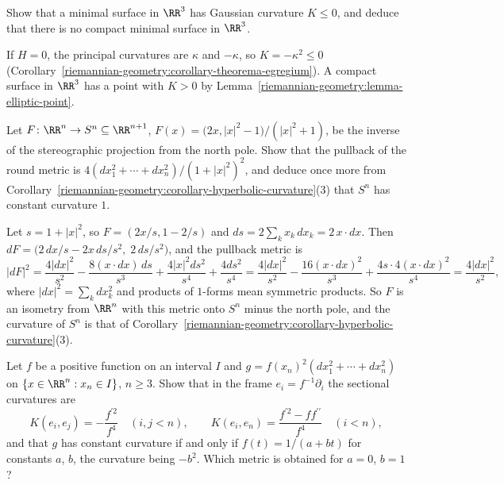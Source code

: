 \begin{exercise}\label{riemannian-geometry:exercise-no-compact-minimal}
Show that a minimal surface in $\RR^3$ has Gaussian curvature $K \leq 0$, and deduce that there is no compact minimal surface in $\RR^3$.
\end{exercise}

\begin{solution}
If $H = 0$, the principal curvatures are $\kappa$ and $-\kappa$, so $K = -\kappa^2 \leq 0$ (Corollary~\ref{riemannian-geometry:corollary-theorema-egregium}). A compact surface in
$\RR^3$ has a point with $K > 0$ by Lemma~\ref{riemannian-geometry:lemma-elliptic-point}.
\end{solution}

\begin{exercise}\label{riemannian-geometry:exercise-stereographic-metric}
Let $F \colon \RR^n \to S^n \subseteq \RR^{n+1}$, $F(x) = \bigl(2x, |x|^2 - 1\bigr)/(|x|^2 + 1)$, be the inverse of the stereographic projection from the north pole. Show that the pullback of the
round metric is $4(dx_1^2 + \cdots + dx_n^2)/(1 + |x|^2)^2$, and deduce once more from Corollary~\ref{riemannian-geometry:corollary-hyperbolic-curvature}(3) that $S^n$ has constant curvature $1$.
\end{exercise}

\begin{solution}
Let $s = 1 + |x|^2$, so $F = (2x/s, 1 - 2/s)$ and $ds = 2\sum_kx_k\,dx_k = 2\,x \cdot dx$. Then $dF = \bigl(2\,dx/s - 2x\,ds/s^2,\; 2\,ds/s^2\bigr)$, and the pullback metric is
\[
|dF|^2 = \frac{4|dx|^2}{s^2} - \frac{8(x \cdot dx)\,ds}{s^3} + \frac{4|x|^2ds^2}{s^4} + \frac{4ds^2}{s^4} = \frac{4|dx|^2}{s^2} - \frac{16(x \cdot dx)^2}{s^3} + \frac{4s \cdot 4(x \cdot dx)^2}{s^4} = \frac{4|dx|^2}{s^2},
\]
where $|dx|^2 = \sum_kdx_k^2$ and products of $1$-forms mean symmetric products. So $F$ is an isometry from $\RR^n$ with this metric onto $S^n$ minus the north pole, and the curvature of $S^n$ is
that of Corollary~\ref{riemannian-geometry:corollary-hyperbolic-curvature}(3).
\end{solution}

\begin{exercise}\label{riemannian-geometry:exercise-metrics-height}
Let $f$ be a positive function on an interval $I$ and $g = f(x_n)^2(dx_1^2 + \cdots + dx_n^2)$ on $\{x \in \RR^n : x_n \in I\}$, $n \geq 3$. Show that in the frame $e_i = f^{-1}\partial_i$
the sectional curvatures are
\[
K(e_i, e_j) = -\frac{f^{\prime2}}{f^4}\quad(i, j < n), \qquad K(e_i, e_n) = \frac{f^{\prime2} - ff^{\prime\prime}}{f^4}\quad(i < n),
\]
and that $g$ has constant curvature if and only if $f(t) = 1/(a + bt)$ for constants $a$, $b$, the curvature being $-b^2$. Which metric is obtained for $a = 0$, $b = 1$?
\end{exercise}


